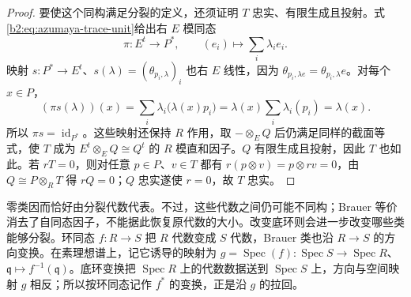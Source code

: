 \begin{proof}
	要使这个同构满足分裂的定义，还须证明 \(T\) 忠实、有限生成且投射。式\eqref{b2:eq:azumaya-trace-unit}给出右 \(E\) 模同态
	\[
		\pi:E^t\longrightarrow P^*,\qquad (e_i)\longmapsto\sum_i\lambda_i e_i.
	\]
	映射 \(s:P^*\rightarrow E^t\)、\(s(\lambda)=(\theta_{p_i,\lambda})_i\) 也右 \(E\) 线性，因为 \(\theta_{p_i,\lambda e}=\theta_{p_i,\lambda}e\)。对每个 \(x\in P\)，
	\[
		(\pi s(\lambda))(x) =\sum_i\lambda_i\bigl(\lambda(x)p_i\bigr) =\lambda(x)\sum_i\lambda_i(p_i) =\lambda(x).
	\]
	所以 \(\pi s=\operatorname{id}_{P^*}\)。这些映射还保持 \(R\) 作用，取 \(-\otimes_EQ\) 后仍满足同样的截面等式，使 \(T\) 成为 \(E^t\otimes_EQ\cong Q^t\) 的 \(R\) 模直和因子。\(Q\) 有限生成且投射，因此 \(T\) 也如此。若 \(rT=0\)，则对任意 \(p\in P\)、\(v\in T\) 都有 \(r(p\otimes v)=p\otimes rv=0\)，由 \(Q\cong P\otimes_RT\) 得 \(rQ=0\)；\(Q\) 忠实遂使 \(r=0\)，故 \(T\) 忠实。
\end{proof}

零类因而恰好由分裂代数代表。不过，这些代数之间仍可能不同构；Brauer 等价消去了自同态因子，不能据此恢复原代数的大小。改变底环则会进一步改变哪些类能够分裂。环同态 \(f:R\rightarrow S\) 把 \(R\) 代数变成 \(S\) 代数，Brauer 类也沿 \(R\rightarrow S\) 的方向变换。在素理想谱上，记它诱导的映射为 \(g=\operatorname{Spec}(f):\operatorname{Spec}S\rightarrow\operatorname{Spec}R\)、\(\mathfrak q\mapsto f^{-1}(\mathfrak q)\)。底环变换把 \(\operatorname{Spec}R\) 上的代数数据送到 \(\operatorname{Spec}S\) 上，方向与空间映射 \(g\) 相反；所以按环同态记作 \(f^*\) 的变换，正是沿 \(g\) 的拉回。

